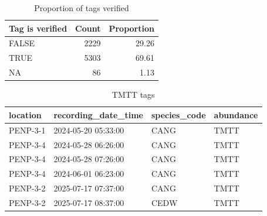 \documentclass[
  letterpaper,
  DIV=11,
  numbers=noendperiod]{scrartcl}
\begin{document}
\begin{longtable}[]
\end{longtable}

\begin{longtable}[]{@{}lrr@{}}

\caption{\label{tbl-verified}Proportion of tags verified}

\tabularnewline

\toprule\noalign{}
Tag is verified & Count & Proportion \\
\midrule\noalign{}
\endhead
\bottomrule\noalign{}
\endlastfoot
FALSE & 2229 & 29.26 \\
TRUE & 5303 & 69.61 \\
NA & 86 & 1.13 \\

\end{longtable}

\begin{longtable}[]{@{}llll@{}}

\caption{\label{tbl-tmtt}TMTT tags}

\tabularnewline

\toprule\noalign{}
location & recording\_date\_time & species\_code & abundance \\
\midrule\noalign{}
\endhead
\bottomrule\noalign{}
\endlastfoot
PENP-3-1 & 2024-05-20 05:33:00 & CANG & TMTT \\
PENP-3-4 & 2024-05-28 06:26:00 & CANG & TMTT \\
PENP-3-4 & 2024-05-28 07:26:00 & CANG & TMTT \\
PENP-3-4 & 2024-06-01 06:23:00 & CANG & TMTT \\
PENP-3-2 & 2025-07-17 07:37:00 & CANG & TMTT \\
PENP-3-2 & 2025-07-17 08:37:00 & CEDW & TMTT \\

\end{longtable}
\end{document}
